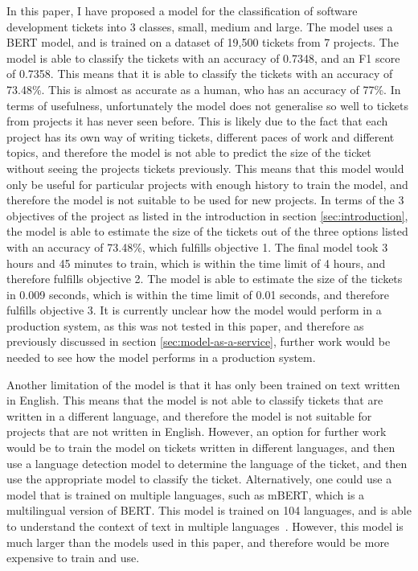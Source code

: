 \documentclass{UoYCSproject}
\begin{document}
    In this paper, I have proposed a model for the classification of software development tickets into 3 classes, small, medium and large.
    The model uses a BERT model, and is trained on a dataset of 19,500 tickets from 7 projects.
    The model is able to classify the tickets with an accuracy of 0.7348, and an F1 score of 0.7358.
    This means that it is able to classify the tickets with an accuracy of 73.48\%.
    This is almost as accurate as a human, who has an accuracy of 77\%.
In terms of usefulness, unfortunately the model does not generalise so well to tickets from projects it has never seen before.
    This is likely due to the fact that each project has its own way of writing tickets, different paces of work and different topics, and therefore the model is not able to predict the size of the ticket without seeing the projects tickets previously.
    This means that this model would only be useful for particular projects with enough history to train the model, and therefore the model is not suitable to be used for new projects.
    In terms of the 3 objectives of the project as listed in the introduction in section \ref{sec:introduction}, the model is able to estimate the size of the tickets out of the three options listed with an accuracy of 73.48\%, which fulfills objective 1. The final model took 3 hours and 45 minutes to train, which is within the time limit of 4 hours, and therefore fulfills objective 2. The model is able to estimate the size of the tickets in 0.009 seconds, which is within the time limit of 0.01 seconds, and therefore fulfills objective 3. It is currently unclear how the model would perform in a production system, as this was not tested in this paper, and therefore as previously discussed in section \ref{sec:model-as-a-service}, further work would be needed to see how the model performs in a production system.

    Another limitation of the model is that it has only been trained on text written in English. This means that the model is not able to classify tickets that are written in a different language, and therefore the model is not suitable for projects that are not written in English.
    However, an option for further work would be to train the model on tickets written in different languages, and then use a language detection model to determine the language of the ticket, and then use the appropriate model to classify the ticket. Alternatively, one could use a model that is trained on multiple languages, such as mBERT, which is a multilingual version of BERT. This model is trained on 104 languages, and is able to understand the context of text in multiple languages~\cite{devlin2018bert}. However, this model is much larger than the models used in this paper, and therefore would be more expensive to train and use.
\end{document}

